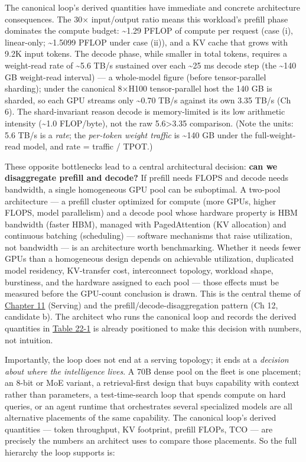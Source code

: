 The canonical loop's derived quantities have immediate and concrete
architecture consequences. The 30× input/output ratio means this
workload's prefill phase dominates the compute budget:
\textasciitilde1.29 PFLOP of compute per request (case (i), linear-only;
\textasciitilde1.5099 PFLOP under case (ii)), and a KV cache that grows
with 9.2K input tokens. The decode phase, while smaller in total tokens,
requires a weight-read rate of \textasciitilde5.6 TB/s sustained over
each \textasciitilde25 ms decode step (the \textasciitilde140 GB
weight-read interval) --- a whole-model figure (before tensor-parallel
sharding); under the canonical 8×H100 tensor-parallel host the 140 GB is
sharded, so each GPU streams only \textasciitilde0.70 TB/s against its
own 3.35 TB/s (Ch 6). The shard-invariant reason decode is
memory-limited is its low arithmetic intensity (\textasciitilde1.0
FLOP/byte), not the raw 5.6\textgreater3.35 comparison. (Note the units:
5.6 TB/s is a \emph{rate}; the \emph{per-token weight traffic} is
\textasciitilde140 GB under the full-weight-read model, and rate =
traffic / TPOT.)

These opposite bottlenecks lead to a central architectural decision:
\textbf{can we disaggregate prefill and decode?} If prefill needs FLOPS
and decode needs bandwidth, a single homogeneous GPU pool can be
suboptimal. A two-pool architecture --- a prefill cluster optimized for
compute (more GPUs, higher FLOPS, model parallelism) and a decode pool
whose hardware property is HBM bandwidth (faster HBM), managed with
PagedAttention (KV allocation) and continuous batching (scheduling) ---
software mechanisms that raise utilization, not bandwidth --- is an
architecture worth benchmarking. Whether it needs fewer GPUs than a
homogeneous design depends on achievable utilization, duplicated model
residency, KV-transfer cost, interconnect topology, workload shape,
burstiness, and the hardware assigned to each pool --- those effects
must be measured before the GPU-count conclusion is drawn. This is the
central theme of \hyperref[chap:11]{Chapter 11} (Serving) and the
prefill/decode-disaggregation pattern (Ch 12, candidate b). The
architect who runs the canonical loop and records the derived quantities
in \hyperref[tab:22.1]{Table 22-1} is already positioned to make this decision with numbers,
not intuition.

Importantly, the loop does not end at a serving topology; it ends at a
\emph{decision about where the intelligence lives}. A 70B dense pool on
the fleet is one placement; an 8-bit or MoE variant, a retrieval-first
design that buys capability with context rather than parameters, a
test-time-search loop that spends compute on hard queries, or an agent
runtime that orchestrates several specialized models are all alternative
placements of the same capability. The canonical loop's derived
quantities --- token throughput, KV footprint, prefill FLOPs, TCO ---
are precisely the numbers an architect uses to compare those placements.
So the full hierarchy the loop supports is:

